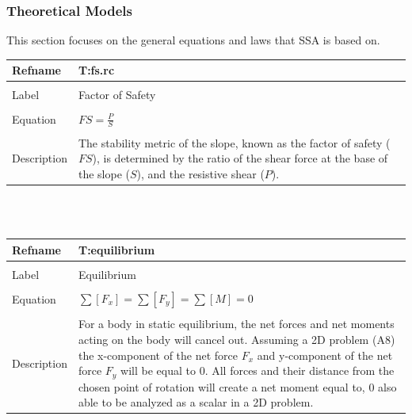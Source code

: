 \documentclass[12pt]{article}
\begin{document}
\subsubsection{Theoretical Models}
\label{Sec:TMs}
This section focuses on the general equations and laws that SSA is based on.
~\newline
\noindent \begin{minipage}{\textwidth}
\begin{tabular}{p{} p{}}
\toprule \textbf{Refname} & \textbf{T:fs.rc}
\label{T:fs.rc}
\\ \midrule \\
Label & Factor of Safety
\\ \midrule \\
Equation & $FS=\frac{P}{S}$
\\ \midrule \\
Description & The stability metric of the slope, known as the factor of safety ($FS$), is determined by the ratio of the shear force at the base of the slope ($S$), and the resistive shear ($P$).
\\ \bottomrule \end{tabular}
\end{minipage}\\
~\newline
\noindent \begin{minipage}{\textwidth}
\begin{tabular}{p{} p{}}
\toprule \textbf{Refname} & \textbf{T:equilibrium}
\label{T:equilibrium}
\\ \midrule \\
Label & Equilibrium
\\ \midrule \\
Equation & $\displaystyle\sum{\left[{F_{x}}\right]}=\displaystyle\sum{\left[{F_{y}}\right]}=\displaystyle\sum{\left[M\right]}=0$
\\ \midrule \\
Description & For a body in static equilibrium, the net forces and net moments acting on the body will cancel out. Assuming a 2D problem (A8) the x-component of the net force ${F_{x}}$ and y-component of the net force ${F_{y}}$ will be equal to $0$. All forces and their distance from the chosen point of rotation will create a net moment equal to, $0$ also able to be analyzed as a scalar in a 2D problem.
\\ \bottomrule \end{tabular}
\end{minipage}\\
\end{document}
